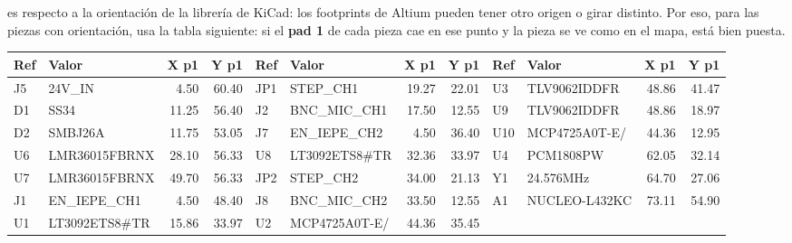 \documentclass[10pt,a4paper]{article}
\begin{document}
es respecto a la orientación de la librería de KiCad: los footprints de Altium pueden tener otro origen o girar
distinto. Por eso, para las piezas con orientación, usa la tabla siguiente: si el \textbf{pad 1} de cada pieza
cae en ese punto y la pieza se ve como en el mapa, está bien puesta.
{\scriptsize\begin{longtable}{@{}llrr|llrr|llrr@{}}\toprule
\textbf{Ref} & \textbf{Valor} & \textbf{X p1} & \textbf{Y p1} & \textbf{Ref} & \textbf{Valor} & \textbf{X p1} & \textbf{Y p1} & \textbf{Ref} & \textbf{Valor} & \textbf{X p1} & \textbf{Y p1}\\\midrule\endhead
J5 & 24V\_\allowbreak{}IN & 4.50 & 60.40 & JP1 & STEP\_\allowbreak{}CH1 & 19.27 & 22.01 & U3 & TLV9062IDDFR & 48.86 & 41.47\\
D1 & SS34 & 11.25 & 56.40 & J2 & BNC\_\allowbreak{}MIC\_\allowbreak{}CH1 & 17.50 & 12.55 & U9 & TLV9062IDDFR & 48.86 & 18.97\\
D2 & SMBJ26A & 11.75 & 53.05 & J7 & EN\_\allowbreak{}IEPE\_\allowbreak{}CH2 & 4.50 & 36.40 & U10 & MCP4725A0T-E/ & 44.36 & 12.95\\
U6 & LMR36015FBRNX & 28.10 & 56.33 & U8 & LT3092ETS8\#TR & 32.36 & 33.97 & U4 & PCM1808PW & 62.05 & 32.14\\
U7 & LMR36015FBRNX & 49.70 & 56.33 & JP2 & STEP\_\allowbreak{}CH2 & 34.00 & 21.13 & Y1 & 24.576MHz & 64.70 & 27.06\\
J1 & EN\_\allowbreak{}IEPE\_\allowbreak{}CH1 & 4.50 & 48.40 & J8 & BNC\_\allowbreak{}MIC\_\allowbreak{}CH2 & 33.50 & 12.55 & A1 & NUCLEO-L432KC & 73.11 & 54.90\\
U1 & LT3092ETS8\#TR & 15.86 & 33.97 & U2 & MCP4725A0T-E/ & 44.36 & 35.45 & & & &\\
\bottomrule\end{longtable}}
\end{document}
